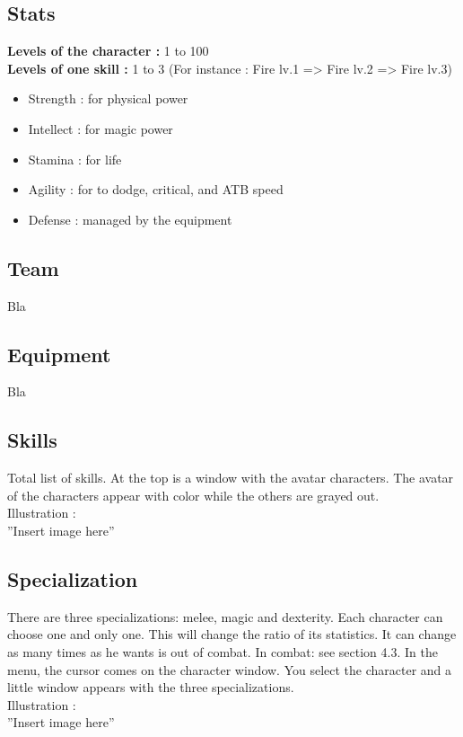\documentclass[a4paper,12pt]{book}
\begin{document}
\subsection{Stats}
\textbf{Levels of the character :} 1 to 100 \\
\textbf{Levels of one skill :} 1 to 3 \newpage (For instance : Fire lv.1 => Fire lv.2 => Fire lv.3)
\begin{itemize}
\item Strength : for physical power
\item Intellect : for magic power
\item Stamina : for life
\item Agility : for to dodge, critical, and ATB speed
\item Defense : managed by the equipment
\end{itemize}
\subsection{Team}
Bla
\subsection{Equipment}
Bla
\subsection{Skills}
Total list of skills. At the top is a window with the avatar characters. The avatar of the characters appear with color while the others are grayed out. \\ Illustration : \\ ''Insert image here''
\subsection{Specialization}
There are three specializations: melee, magic and dexterity. Each character can choose one and only one. This will change the ratio of its statistics. It can change as many times as he wants is out of combat. In combat: see section 4.3.
In the menu, the cursor comes on the character window. You select the character and a little window appears with the three specializations. \\ Illustration : \\ ''Insert image here''
\end{document}
